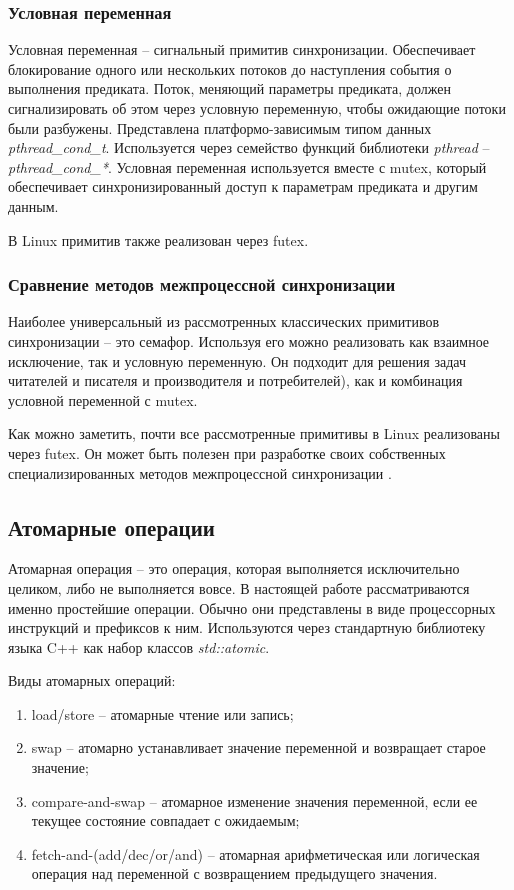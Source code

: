 \subsubsection{Условная переменная}

Условная переменная -- сигнальный примитив синхронизации. Обеспечивает блокирование одного или нескольких потоков до наступления события о выполнения предиката. Поток, меняющий параметры предиката, должен сигнализировать об этом через условную переменную, чтобы ожидающие потоки были разбужены. Представлена платформо-зависимым типом данных \textit{pthread\_cond\_t}. Используется через семейство функций библиотеки \textit{pthread} -- \textit{pthread\_cond\_*}. Условная переменная используется вместе с mutex, который обеспечивает синхронизированный доступ к параметрам предиката и другим данным.

В Linux примитив также реализован через futex.

\subsubsection{Сравнение методов межпроцессной синхронизации}

Наиболее универсальный из рассмотренных классических примитивов синхронизации -- это семафор. Используя его можно реализовать как взаимное исключение, так и условную переменную. Он подходит для решения задач читателей и писателя и производителя и потребителей), как и комбинация условной переменной с mutex.

Как можно заметить, почти все рассмотренные примитивы в Linux реализованы через futex. Он может быть полезен при разработке своих собственных специализированных методов межпроцессной синхронизации \cite{FutexesAreTricky}.

\subsection{Атомарные операции}

Атомарная операция -- это операция, которая выполняется исключительно целиком, либо не выполняется вовсе. В настоящей работе рассматриваются именно простейшие операции. Обычно они представлены в виде процессорных инструкций и префиксов к ним. Используются через стандартную библиотеку языка C++ как набор классов \textit{std::atomic}.

Виды атомарных операций:
\begin{enumerate}
\item load/store -- атомарные чтение или запись;
\item swap -- атомарно устанавливает значение переменной и возвращает старое значение;
\item compare-and-swap -- атомарное изменение значения переменной, если ее текущее состояние совпадает с ожидаемым;
\item fetch-and-(add/dec/or/and) -- атомарная арифметическая или логическая операция над переменной с возвращением предыдущего значения.
\end{enumerate}

